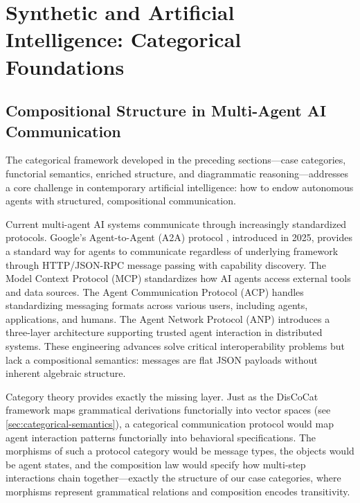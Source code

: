 \documentclass[
]{article}
\numberwithin{equation}{section}
\begin{document}
\section{Synthetic and Artificial Intelligence: Categorical
Foundations}\label{sec:ai-implications}

\subsection{Compositional Structure in Multi-Agent AI
Communication}\label{compositional-structure-in-multi-agent-ai-communication}

The categorical framework developed in the preceding sections---case
categories, functorial semantics, enriched structure, and diagrammatic
reasoning---addresses a core challenge in contemporary artificial
intelligence: how to endow autonomous agents with structured,
compositional communication.

Current multi-agent AI systems communicate through increasingly
standardized protocols. Google's Agent-to-Agent (A2A) protocol
\citep{google2025a2a}, introduced in 2025, provides a standard way for
agents to communicate regardless of underlying framework through
HTTP/JSON-RPC message passing with capability discovery. The Model
Context Protocol (MCP) \citep{anthropic2024mcp} standardizes how AI
agents access external tools and data sources. The Agent Communication
Protocol (ACP) \citep{acp2025protocol} handles standardizing messaging
formats across various users, including agents, applications, and
humans. The Agent Network Protocol (ANP) \citep{anp2025protocol}
introduces a three-layer architecture supporting trusted agent
interaction in distributed systems. These engineering advances solve
critical interoperability problems but lack a compositional semantics:
messages are flat JSON payloads without inherent algebraic structure.

Category theory provides exactly the missing layer. Just as the DisCoCat
framework maps grammatical derivations functorially into vector spaces
(see \autoref{sec:categorical-semantics}), a categorical communication
protocol would map agent interaction patterns functorially into
behavioral specifications. The morphisms of such a protocol category
would be message types, the objects would be agent states, and the
composition law would specify how multi-step interactions chain
together---exactly the structure of our case categories, where morphisms
represent grammatical relations and composition encodes transitivity.
\end{document}
